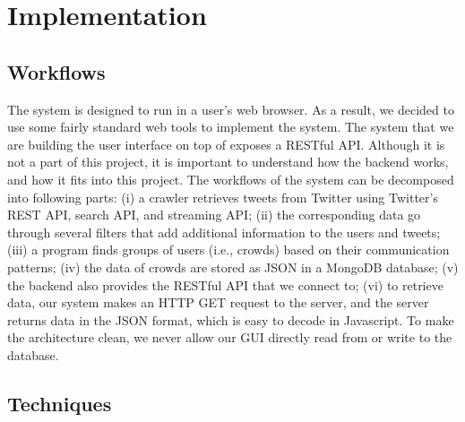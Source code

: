 \documentclass{sig-alternate}
\begin{document}
\begin{itemize}
%
\end{itemize}

\section{Implementation}

\subsection{Workflows}

The system is designed to run in a user's web browser. As a result, we decided
to use some fairly standard web tools to implement the system. The system that
we are building the user interface on top of exposes a RESTful API. Although
it is not a part of this project, it is important to understand how the backend
works, and how it fits into this project. The workflows of the system can be
decomposed into following parts: (i) a crawler retrieves tweets from Twitter using
Twitter's REST API, search API, and streaming API; (ii) the corresponding data
go through several filters that add additional information to the users and
tweets; (iii) a program finds groups of users (i.e., crowds) based on their 
communication patterns; (iv) the data of crowds are stored as JSON in a MongoDB
database; (v) the backend also provides the RESTful API that we connect to; (vi)
to retrieve data, our system makes an HTTP GET request to the server, and the 
server returns data in the JSON format, which is easy to decode in Javascript.
To make the architecture clean, we never allow our GUI directly read from or 
write to the database.

\subsection{Techniques}
\end{document}
